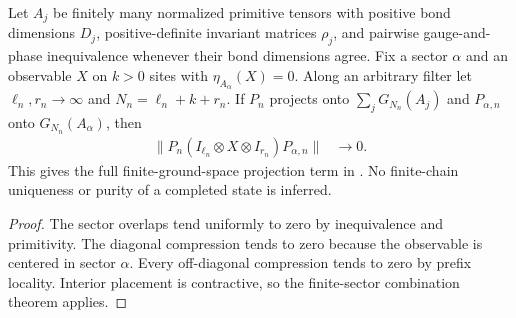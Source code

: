 \begin{lemma}
    \label{thm:multiblock_centered_full_ground_compression}
    \leanok
    Let $A_j$ be finitely many normalized primitive tensors with positive
    bond dimensions $D_j$, positive-definite invariant matrices $\rho_j$,
    and pairwise gauge-and-phase inequivalence whenever their bond dimensions
    agree. Fix a sector $\alpha$ and an observable $X$ on $k>0$ sites
    with $\eta_{A_\alpha}(X)=0$. Along an arbitrary filter let
    $\ell_n,r_n\to\infty$ and $N_n=\ell_n+k+r_n$.
    If $P_n$ projects onto $\sum_jG_{N_n}(A_j)$ and $P_{\alpha,n}$
    onto $G_{N_n}(A_\alpha)$, then
    \begin{align}
        \bigl\|P_n(I_{\ell_n}\otimes X\otimes I_{r_n})P_{\alpha,n}\bigr\|
         & \longrightarrow0.
    \end{align}
    This gives the full finite-ground-space projection term in
    \cite[Section~6]{Nachtergaele1996Spectral}. No finite-chain uniqueness
    or purity of a completed state is inferred.
\end{lemma}
\begin{proof}\leanok
    The sector overlaps tend uniformly to zero by inequivalence and
    primitivity. The diagonal compression tends to zero because the
    observable is centered in sector $\alpha$. Every off-diagonal
    compression tends to zero by prefix locality. Interior placement is
    contractive, so the finite-sector combination theorem applies.
\end{proof}

